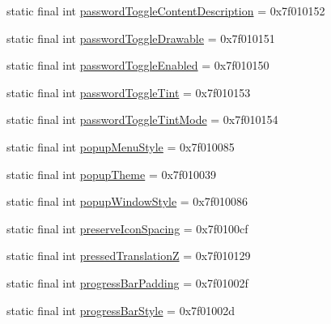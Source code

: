 \begin{CompactItemize}
static final int \hyperlink{classandroid_1_1support_1_1graphics_1_1drawable_1_1animated_1_1_r_1_1attr_1a778b8e61bd3bfed202d24fc1b6d904}{passwordToggleContentDescription} = 0x7f010152
\item 
static final int \hyperlink{classandroid_1_1support_1_1graphics_1_1drawable_1_1animated_1_1_r_1_1attr_004111a3cc5a8a656ffc9e2cd5a5b1c5}{passwordToggleDrawable} = 0x7f010151
\item 
static final int \hyperlink{classandroid_1_1support_1_1graphics_1_1drawable_1_1animated_1_1_r_1_1attr_b308181e48788e289785ce156d2f9f36}{passwordToggleEnabled} = 0x7f010150
\item 
static final int \hyperlink{classandroid_1_1support_1_1graphics_1_1drawable_1_1animated_1_1_r_1_1attr_74ed8d9a12f4a9ca8615ea264f7bc765}{passwordToggleTint} = 0x7f010153
\item 
static final int \hyperlink{classandroid_1_1support_1_1graphics_1_1drawable_1_1animated_1_1_r_1_1attr_f7fc1e93155fdaf03f2344ddf34e47b2}{passwordToggleTintMode} = 0x7f010154
\item 
static final int \hyperlink{classandroid_1_1support_1_1graphics_1_1drawable_1_1animated_1_1_r_1_1attr_3cea557f3aab04cd234ac591934e7f3e}{popupMenuStyle} = 0x7f010085
\item 
static final int \hyperlink{classandroid_1_1support_1_1graphics_1_1drawable_1_1animated_1_1_r_1_1attr_043a7a6b0810ad150499fbb38dd1496b}{popupTheme} = 0x7f010039
\item 
static final int \hyperlink{classandroid_1_1support_1_1graphics_1_1drawable_1_1animated_1_1_r_1_1attr_60538fdbd74060c7bdcec88537888afd}{popupWindowStyle} = 0x7f010086
\item 
static final int \hyperlink{classandroid_1_1support_1_1graphics_1_1drawable_1_1animated_1_1_r_1_1attr_119ef6c79b4784a26a69b95d11166b5c}{preserveIconSpacing} = 0x7f0100cf
\item 
static final int \hyperlink{classandroid_1_1support_1_1graphics_1_1drawable_1_1animated_1_1_r_1_1attr_12bc1f06a931d28197c75d5419068676}{pressedTranslationZ} = 0x7f010129
\item 
static final int \hyperlink{classandroid_1_1support_1_1graphics_1_1drawable_1_1animated_1_1_r_1_1attr_23159ba2afe9eb2ea58892fa0e6c3979}{progressBarPadding} = 0x7f01002f
\item 
static final int \hyperlink{classandroid_1_1support_1_1graphics_1_1drawable_1_1animated_1_1_r_1_1attr_2dda55e1072c090180314f4d607b5f5c}{progressBarStyle} = 0x7f01002d
\item 

\end{CompactItemize}
